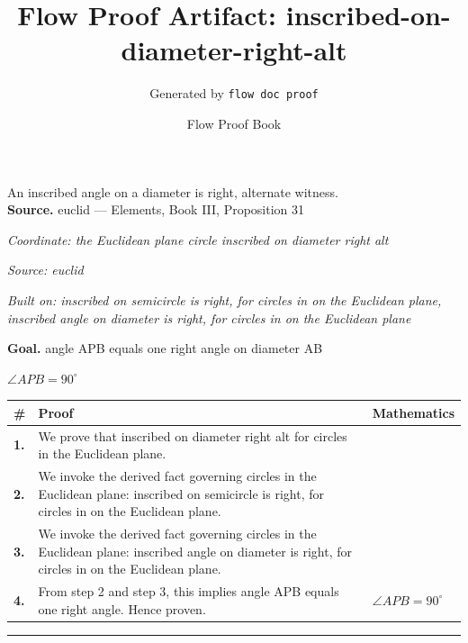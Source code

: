 \documentclass[11pt]{article}
\title{Flow Proof Artifact: inscribed-on-diameter-right-alt}
\author{Generated by \texttt{flow doc proof}}
\date{Flow Proof Book}
\theoremstyle{definition}
\begin{document}
\maketitle
An inscribed angle on a diameter is right, alternate witness.\\[0.5em]
\textbf{Source.} euclid — Elements, Book III, Proposition 31\\[0.5em]
\bigskip
{}\par
\smallskip\noindent\textit{Coordinate: the Euclidean plane \cdot circle \cdot inscribed on diameter right alt}\par
\smallskip\noindent\textit{Source: euclid}\par
\smallskip\noindent\textit{Built on: inscribed on semicircle is right, for circles in on the Euclidean plane, inscribed angle on diameter is right, for circles in on the Euclidean plane}\par
\medskip
\noindent\textbf{Goal.} angle APB equals one right angle on diameter AB\par
\noindent$\displaystyle \angle APB = 90^\circ$\par
\medskip
\noindent
\begin{tabular}{@{} >{\raggedright\arraybackslash}p{} >{\raggedright\arraybackslash}p{} >{\raggedleft\arraybackslash}p{} @{}}
\textbf{\#} & \textbf{Proof} & \textbf{Mathematics} \\
\midrule
\textbf{1.} & We prove that inscribed on diameter right alt for circles in the Euclidean plane. & \\[0.45em]
\textbf{2.} & We invoke the derived fact governing circles in the Euclidean plane: inscribed on semicircle is right, for circles in on the Euclidean plane. & \\[0.45em]
\textbf{3.} & We invoke the derived fact governing circles in the Euclidean plane: inscribed angle on diameter is right, for circles in on the Euclidean plane. & \\[0.45em]
\textbf{4.} & From step 2 and step 3, this implies angle APB equals one right angle. Hence proven. & $\displaystyle \angle APB = 90^\circ$ \\[0.45em]
\bottomrule
\end{tabular}
\label{thm:Geometry-circle-inscribed_on_diameter_right_alt}
\par\medskip\hrule
\end{document}
